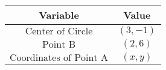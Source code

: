 
    \begin{tabular}{ |c|c| }
        \hline
        \textbf{Variable} & \textbf{Value} \\ 
        \hline
        $\text{Center of Circle}$ & $(3, -1)$ \\ 
        \hline
        $\text{Point B}$ & $(2, 6)$ \\ 
        \hline
        $\text{Coordinates of Point A}$ & $(x, y)$ \\ 
        \hline
    \end{tabular}


